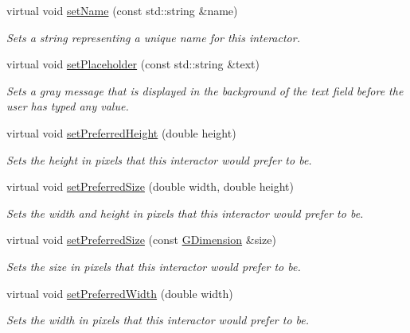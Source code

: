 \begin{DoxyCompactItemize}
virtual void \mbox{\hyperlink{classGInteractor_a9d3a2685df23b5e7cbf59c19c4a1f9b5}{set\+Name}} (const std\+::string \&name)
\begin{DoxyCompactList}\small\item\em Sets a string representing a unique name for this interactor. \end{DoxyCompactList}\item 
virtual void \mbox{\hyperlink{classGTextField_aa21a9bebb4652ab6780d0c11eff47aee}{set\+Placeholder}} (const std\+::string \&text)
\begin{DoxyCompactList}\small\item\em Sets a gray message that is displayed in the background of the text field before the user has typed any value. \end{DoxyCompactList}\item 
virtual void \mbox{\hyperlink{classGInteractor_a1ab987704fce32098706c6f00fb08218}{set\+Preferred\+Height}} (double height)
\begin{DoxyCompactList}\small\item\em Sets the height in pixels that this interactor would prefer to be. \end{DoxyCompactList}\item 
virtual void \mbox{\hyperlink{classGInteractor_a042c5ae19430d765ef552371cae3632c}{set\+Preferred\+Size}} (double width, double height)
\begin{DoxyCompactList}\small\item\em Sets the width and height in pixels that this interactor would prefer to be. \end{DoxyCompactList}\item 
virtual void \mbox{\hyperlink{classGInteractor_aa22d9be4bc0e078bb0ea69b0fc9d7c75}{set\+Preferred\+Size}} (const \mbox{\hyperlink{structGDimension}{G\+Dimension}} \&size)
\begin{DoxyCompactList}\small\item\em Sets the size in pixels that this interactor would prefer to be. \end{DoxyCompactList}\item 
virtual void \mbox{\hyperlink{classGInteractor_a3db429ab2fa52efd187eec0ed8cdd9f2}{set\+Preferred\+Width}} (double width)
\begin{DoxyCompactList}\small\item\em Sets the width in pixels that this interactor would prefer to be. \end{DoxyCompactList}\item 

\end{DoxyCompactItemize}
